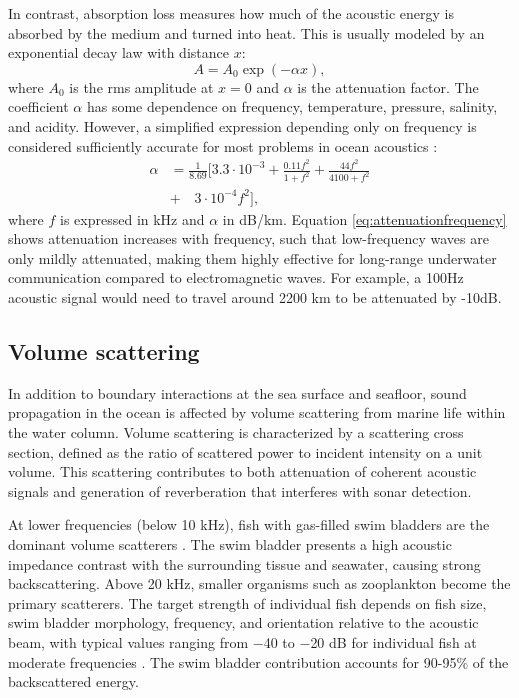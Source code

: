 \documentclass[fleqn]{jaes}
\begin{document}
In contrast, absorption loss measures how much of the acoustic energy is absorbed by the medium and turned into heat. This is usually modeled by an exponential decay law with distance $x$:
\begin{equation}
    A = A_0 \exp (-\alpha x),
    \label{eq:attenuationdecay}
\end{equation}
where $A_0$ is the rms amplitude at $x=0$ and $\alpha$ is the attenuation factor. The coefficient $\alpha$ has some dependence on frequency, temperature, pressure, salinity, and acidity. However, a simplified expression depending only on frequency is considered sufficiently accurate for most problems in ocean acoustics \cite{Jensen, urick1979}:
\begin{equation}
    \begin{split}
        \alpha &= \frac{1}{8.69} \big[ 3.3 \cdot 10^{-3} + \frac{0.11f^2}
        {1+f^2} + \frac{44f^2}{4100+f^2} \\
        &+ \quad 3\cdot 10^{-4} f^2\big],
    \end{split}
    \label{eq:attenuationfrequency}
\end{equation}
where $f$ is expressed in kHz and $\alpha$ in dB/km. Equation \ref{eq:attenuationfrequency} shows attenuation increases with frequency, such that low-frequency waves are only mildly attenuated, making them highly effective for long-range underwater communication compared to electromagnetic waves. For example, a 100Hz acoustic signal would need to travel around 2200 km to be attenuated by -10dB.

\subsection{Volume scattering}
In addition to boundary interactions at the sea surface and seafloor, sound propagation in the ocean is affected by volume scattering from marine life within the water column. Volume scattering is characterized by a scattering cross section, defined as the ratio of scattered power to incident intensity on a unit volume. This scattering contributes to both attenuation of coherent acoustic signals and generation of reverberation that interferes with sonar detection.

At lower frequencies (below 10 kHz), fish with gas-filled swim bladders are the dominant volume scatterers \cite{Jensen}. The swim bladder presents a high acoustic impedance contrast with the surrounding tissue and seawater, causing strong backscattering. Above 20 kHz, smaller organisms such as zooplankton become the primary scatterers. The target strength of individual fish depends on fish size, swim bladder morphology, frequency, and orientation relative to the acoustic beam, with typical values ranging from $-$40 to $-$20 dB for individual fish at moderate frequencies \cite{Foote1980}. The swim bladder contribution accounts for 90-95\% of the backscattered energy.
\end{document}
